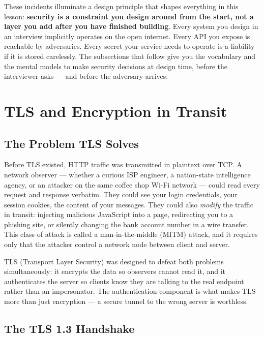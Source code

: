 \documentclass[11pt,a4paper]{article}
\begin{document}
These incidents illuminate a design principle that shapes everything in this lesson: \textbf{security is a constraint you design around from the start, not a layer you add after you have finished building}. Every system you design in an interview implicitly operates on the open internet. Every API you expose is reachable by adversaries. Every secret your service needs to operate is a liability if it is stored carelessly. The subsections that follow give you the vocabulary and the mental models to make security decisions at design time, before the interviewer asks --- and before the adversary arrives.

\section{TLS and Encryption in Transit}

\subsection{The Problem TLS Solves}

Before TLS existed, HTTP traffic was transmitted in plaintext over TCP. A network observer --- whether a curious ISP engineer, a nation-state intelligence agency, or an attacker on the same coffee shop Wi-Fi network --- could read every request and response verbatim. They could see your login credentials, your session cookies, the content of your messages. They could also \textit{modify} the traffic in transit: injecting malicious JavaScript into a page, redirecting you to a phishing site, or silently changing the bank account number in a wire transfer. This class of attack is called a man-in-the-middle (MITM) attack, and it requires only that the attacker control a network node between client and server.

TLS (Transport Layer Security) was designed to defeat both problems simultaneously: it encrypts the data so observers cannot read it, and it authenticates the server so clients know they are talking to the real endpoint rather than an impersonator. The authentication component is what makes TLS more than just encryption --- a secure tunnel to the wrong server is worthless.

\subsection{The TLS 1.3 Handshake}
\end{document}

